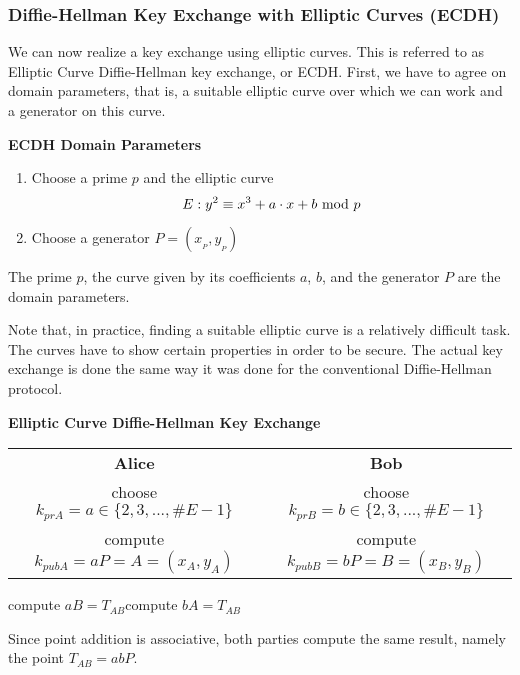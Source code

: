 \subsubsection{Diffie-Hellman Key Exchange with Elliptic Curves (ECDH)}
We can now realize a key exchange using elliptic curves. This is referred to as Elliptic Curve Diffie-Hellman key exchange, or ECDH. First, we have to agree on domain parameters, that is, a suitable elliptic curve over which we can work and a generator on this curve.
\begin{framed}
    \hfill\break\textbf{ECDH Domain Parameters}
    \begin{enumerate}
        \item Choose a prime $p$ and the elliptic curve
        $$E:y^2\equiv x^3+a\cdot x+b\text{ mod } p$$
        \item Choose a generator $P=(x_{_P},y_{_P})$
    \end{enumerate}
    The prime $p$, the curve given by its coefficients $a$, $b$, and the generator $P$ are the domain parameters.
\end{framed}
Note that, in practice, finding a suitable elliptic curve is a relatively difficult task. The curves have to show certain properties in order to be secure. The actual key exchange is done the same way it was done for the conventional Diffie-Hellman protocol.
\begin{framed}
    \hfill\break\textbf{Elliptic Curve Diffie-Hellman Key Exchange}
    \begin{center}
        \begin{tabular}{c@{\hskip 3cm}c}
            \textbf{Alice}&\textbf{Bob}\\
            choose $k_{prA}=a\in\{2,3,...,\#E-1\}$&choose $k_{prB}=b\in\{2,3,...,\#E-1\}$\\
            compute $k_{pubA}=aP=A=(x_A,y_A)$&compute $k_{pubB}=bP=B=(x_B,y_B)$
        \end{tabular}
    \end{center}
    \hspace{2.5cm}compute $aB=T_{AB}$\hspace{5.875cm}compute $bA=T_{AB}$
\end{framed}\hfill\break
Since point addition is associative, both parties compute the same result, namely the point $T_{AB}=abP$.\\

